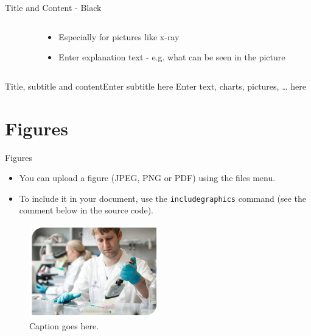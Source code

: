 \documentclass[10pt]{beamer} %
\begin{document}
{\begin{frame}{Title and Content - Black}
\begin{columns}
\begin{column}{0.3\textwidth}
\begin{center}
     \end{center}
  \end{column}
  \begin{column}{0.7\textwidth}  %
    \begin{itemize}
	  \item Especially for pictures like x-ray
	  \item Enter explanation text - e.g. what can be seen in the picture
	\end{itemize}
  \end{column}
\end{columns}

\end{frame}
}


\begin{frame}{Title, subtitle and content}{Enter subtitle here}
Enter text, charts, pictures, … here
\end{frame}

\section{Figures}
\begin{frame}{Figures}

\begin{itemize}
  \item You can upload a figure (JPEG, PNG or PDF) using the files menu. 
  \item To include it in your document, use the \texttt{includegraphics} command (see the comment below in the source code).
\end{itemize}

\begin{figure}
  \includegraphics[width=0.5\textwidth]{Images/image.png}
  \caption{\label{fig:your-figure}Caption goes here.}
\end{figure}

\end{frame}  
\end{document}
